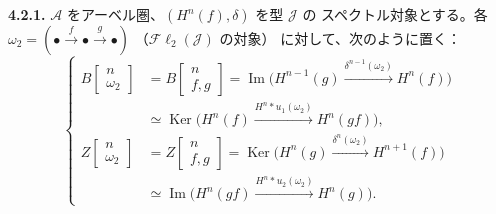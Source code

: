 \medskip\noindent\textbf{4.2.1.}\quad
$\mathcal A$ をアーベル圏、$(H^n(f),\delta)$ を型 $\mathcal J$ の
スペクトル対象とする。各
$\omega_2=(\mathord\bullet\xrightarrow f\mathord\bullet\xrightarrow g\mathord\bullet)$
（$\mathcal{F}\ell_2(\mathcal J)$ の対象）
に対して、次のように置く：
\[
\left\{
\begin{aligned}
B\!\left[\begin{smallmatrix}n\\\omega_2\end{smallmatrix}\right]
&=B\!\left[\begin{smallmatrix}n\\f,g\end{smallmatrix}\right]
=\operatorname{Im}\bigl(H^{n-1}(g)
  \xrightarrow{\delta^{n-1}(\omega_2)}H^n(f)\bigr)\\
&\simeq\operatorname{Ker}\bigl(H^n(f)
  \xrightarrow{H^n*u_1(\omega_2)}H^n(gf)\bigr),\\[2pt]
Z\!\left[\begin{smallmatrix}n\\\omega_2\end{smallmatrix}\right]
&=Z\!\left[\begin{smallmatrix}n\\f,g\end{smallmatrix}\right]
=\operatorname{Ker}\bigl(H^n(g)
  \xrightarrow{\delta^n(\omega_2)}H^{n+1}(f)\bigr)\\
&\simeq\operatorname{Im}\bigl(H^n(gf)
  \xrightarrow{H^n*u_2(\omega_2)}H^n(g)\bigr).
\end{aligned}
\right.
\tag{4.2.1.1}
\]
\endgroup
